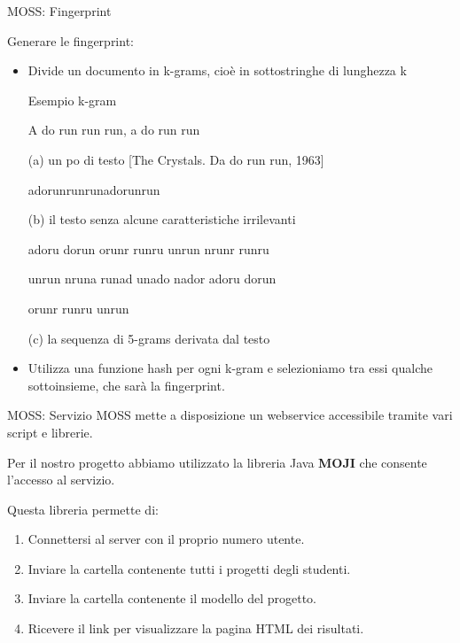 \documentclass{beamer}
\begin{document}
	\begin{frame}{MOSS: Fingerprint}
		
		{\footnotesize Generare le fingerprint:
		\begin{itemize}[<+->]
			\item Divide un documento in k-grams, cioè in sottostringhe di lunghezza k
			\begin{exampleblock}{{\footnotesize Esempio k-gram}}
				\begin{tcolorbox}[size=small]
					A do run run run, a do run run
				\end{tcolorbox}
				(a) un po di testo [The Crystals. Da do run run, 1963]
				
				\pause
				
				\begin{tcolorbox}[size=small]
					adorunrunrunadorunrun
				\end{tcolorbox}
				(b) il testo senza alcune caratteristiche irrilevanti
				
				\pause
				\begin{tcolorbox}[size=small]
					adoru dorun orunr runru unrun nrunr runru
					
					unrun nruna runad unado nador adoru dorun
					
					orunr runru unrun
				\end{tcolorbox}
				(c) la sequenza di 5-grams derivata dal testo
			\end{exampleblock}
			\item Utilizza una funzione hash per ogni k-gram e selezioniamo tra essi qualche sottoinsieme, che sarà la fingerprint.
		\end{itemize}
	}
	\end{frame}

	\begin{frame}{MOSS: Servizio}
		MOSS mette a disposizione un webservice accessibile tramite vari script e librerie.
		
		Per il nostro progetto abbiamo utilizzato la libreria Java \textbf{MOJI} che consente l'accesso al servizio.
		
		\pause
		Questa libreria permette di:
		\begin{enumerate}[<+->]
			\item Connettersi al server con il proprio numero utente.
			\item Inviare la cartella contenente tutti i progetti degli studenti.
			\item Inviare la cartella contenente il modello del progetto.
			\item Ricevere il link per visualizzare la pagina HTML dei risultati.
		\end{enumerate}
	\end{frame}
\end{document}
